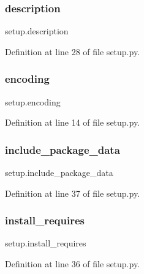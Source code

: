 \subsubsection{\texorpdfstring{description}{description}}
{\footnotesize\ttfamily setup.\+description}



Definition at line 28 of file setup.\+py.

\mbox{\label{namespacesetup_a443be2d01fd539bf6761aff70724d876}} 
\subsubsection{\texorpdfstring{encoding}{encoding}}
{\footnotesize\ttfamily setup.\+encoding}



Definition at line 14 of file setup.\+py.

\mbox{\label{namespacesetup_a35139105b25ef46629d31888bad595d8}} 
\subsubsection{\texorpdfstring{include\+\_\+package\+\_\+data}{include\_package\_data}}
{\footnotesize\ttfamily setup.\+include\+\_\+package\+\_\+data}



Definition at line 37 of file setup.\+py.

\mbox{\label{namespacesetup_abead4f26b530856f858f0d44c7cf2588}} 
\subsubsection{\texorpdfstring{install\+\_\+requires}{install\_requires}}
{\footnotesize\ttfamily setup.\+install\+\_\+requires}



Definition at line 36 of file setup.\+py.

\mbox{\label{namespacesetup_a8ed6f50a28bd6a8794f8e1153baa6de9}} 
